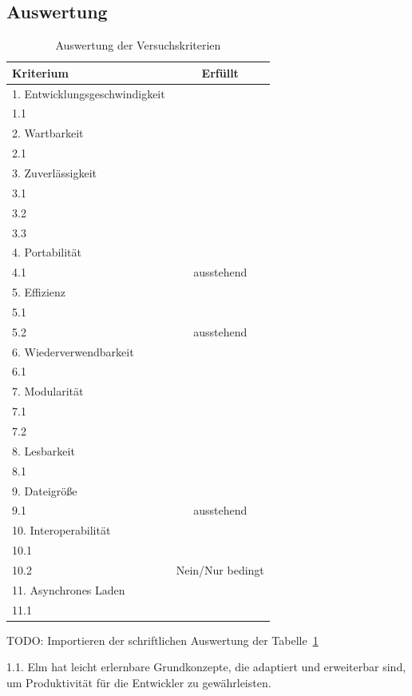 \subsection{Auswertung}
\label{sec:Auswertung}
\begin{table}[h]
\centering
\begin{tabular}{ | l | c | }
	\hline
	\textbf{Kriterium} & \textbf{Erfüllt}\\
	\hline
	1. Entwicklungsgeschwindigkeit & \\
	1.1 & \checkmark\\
	\hline
	2. Wartbarkeit & \\
	2.1  & \checkmark\\
	\hline
	3. Zuverlässigkeit & \\
	3.1  & \checkmark\\
	3.2  & \checkmark\\
	3.3  & \checkmark\\
	\hline
	4. Portabilität & \\
	4.1  & ausstehend\\
	\hline
	5. Effizienz & \\
	5.1  & \checkmark\\
	5.2  & ausstehend\\
	\hline
	6. Wiederverwendbarkeit & \\
	6.1  & \checkmark\\
	\hline
	7. Modularität & \\
	7.1  & \checkmark\\
	7.2  & \checkmark\\
	\hline
	8. Lesbarkeit & \\
	8.1  & \checkmark\\	
	\hline
	9. Dateigröße & \\
	9.1  & ausstehend\\
	\hline
	10. Interoperabilität & \\
	10.1  & \checkmark\\
	10.2  & Nein/Nur bedingt\\
	\hline
	11. Asynchrones Laden & \\
	11.1  & \checkmark\\
	\hline
\end{tabular}
\caption{Auswertung der Versuchskriterien}
\label{tab:Auswertungstabelle}
\end{table}
TODO: Importieren der schriftlichen Auswertung der Tabelle~\ref{tab:Auswertungstabelle}

 1.1. Elm hat leicht erlernbare Grundkonzepte, die adaptiert und erweiterbar sind, um Produktivität für die Entwickler zu gewährleisten.
 
